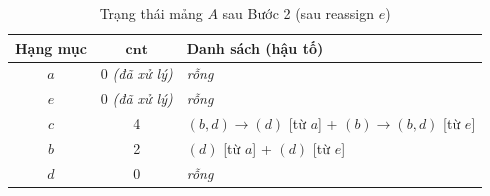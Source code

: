 \documentclass[12pt,a4paper]{report}
\begin{document}
\begin{table}[H]
  \centering
  \caption{Trạng thái mảng $A$ sau Bước 2 (sau reassign $e$)}
  \label{tab:ex1-after2}
  \begin{tabular}{ccl}
    \toprule
    \textbf{Hạng mục} & $\mathbf{cnt}$ & \textbf{Danh sách (hậu tố)} \\
    \midrule
    $a$ & 0 \textit{(đã xử lý)} & \textit{rỗng} \\
    $e$ & 0 \textit{(đã xử lý)} & \textit{rỗng} \\
    $c$ & 4 & $(b,d)\to(d)$ [từ $a$] + $(b)\to(b,d)$ [từ $e$] \\
    $b$ & 2 & $(d)$ [từ $a$] + $(d)$ [từ $e$] \\
    $d$ & 0 & \textit{rỗng} \\
    \bottomrule
  \end{tabular}
\end{table}
 
\end{document}
